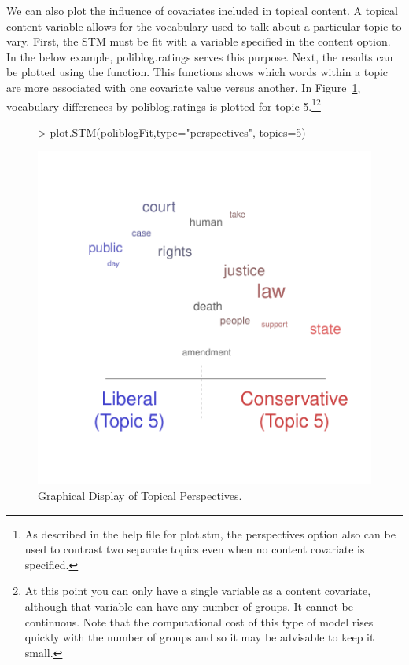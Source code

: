 \documentclass[nojss]{jss}
\begin{document}
We can also plot the influence of covariates included in topical content. A topical content variable allows for the vocabulary used to talk about a particular topic to vary. First, the STM must be fit with a variable specified in the content option. In the below example, poliblog.ratings serves this purpose. Next, the results can be plotted using the  function.  This functions shows which words within a topic are more associated with one covariate value versus another. In Figure~\ref{fig:perp}, vocabulary differences by poliblog.ratings is plotted for topic 5.\footnote{As described in the help file for plot.stm, the perspectives option also can be used to contrast two separate topics even when no content covariate is specified.}\footnote{At this point you can only
 have a single variable as a content covariate, although that variable can have any number of groups. It cannot be continuous. Note that the computational cost of this type of model rises quickly with the number of groups and so it may be advisable to keep it small.}


\begin{figure}[t!]
\begin{center}
\begin{Schunk}
\begin{Sinput}
> plot.STM(poliblogFit,type="perspectives", topics=5)
\end{Sinput}
\end{Schunk}
\includegraphics{stmVignette-013}
\caption{Graphical Display of Topical Perspectives.}
\label{fig:perp}
\end{center}
\end{figure}
\end{document}
